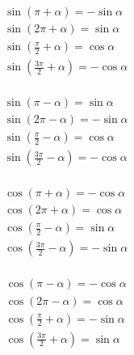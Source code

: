 \documentclass[a4paper, fleqn]{ctexart}
\begin{document}
	\noindent
	\begin{minipage}{0.2\textwidth}
	\small
	\begin{align*}
		& \sin\left( \pi + \alpha \right) = -\sin\alpha \\
		& \sin\left( 2\pi + \alpha \right) = \sin\alpha \\
		& \sin\left( \frac\pi2 + \alpha \right) = \cos\alpha \\
		& \sin\left( \frac{3\pi}2 + \alpha \right) = -\cos\alpha \\
	\end{align*}
	
	\begin{align*}
		& \sin\left( \pi - \alpha \right) = \sin\alpha \\
		& \sin\left( 2\pi - \alpha \right) = -\sin\alpha \\
		& \sin\left( \frac\pi2 - \alpha \right) = \cos\alpha \\
		& \sin\left( \frac{3\pi}2 - \alpha \right) = -\cos\alpha \\
		\end{align*}
	\end{minipage}
	\begin{minipage}{0.2\textwidth}
	\small
	\begin{align*}
		& \cos\left( \pi + \alpha \right) = -\cos\alpha \\
		& \cos\left( 2\pi + \alpha \right) = \cos\alpha \\
		& \cos\left( \frac\pi2 - \alpha \right) = \sin\alpha \\
		& \cos\left( \frac{3\pi}2 - \alpha \right) = -\sin\alpha \\
	\end{align*}
	
	\begin{align*}
		& \cos\left( \pi - \alpha \right) = -\cos\alpha \\
		& \cos\left( 2\pi - \alpha \right) = \cos\alpha \\
		& \cos\left( \frac\pi2 + \alpha \right) = -\sin\alpha \\
		& \cos\left( \frac{3\pi}2 + \alpha \right) = \sin\alpha \\
	\end{align*}
	\end{minipage}
\end{document}
